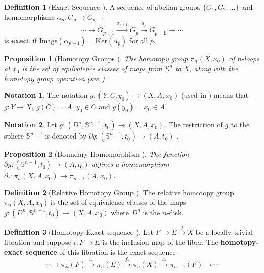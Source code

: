 \documentclass[12pt]{article}
\newtheorem{prop}{Proposition}
\theoremstyle{definition}
\newtheorem{defn}{Definition}
\newtheorem*{notation}{Notation}
\begin{document}
\begin{defn}[Exact Sequence \cite{intro-top-manifolds}]
    A sequence of abelian groups \(\{G_1, G_2, \ldots\}\) and
    homomorphisms \(\alpha_p : G_p \rightarrow G_{p-1}\)
    \[
        \cdots \rightarrow G_{p+1} \xrightarrow{\alpha_{p+1}} G_p
    \xrightarrow{\alpha_p} G_{p-1} \rightarrow \cdots
    \]
    is \textbf{exact} if \(\text{Image}(\alpha_{p+1}) = \text{Ker}(\alpha_p)\)
    for all \(p\).
\end{defn}

\begin{prop}[Homotopy Groups \cite{topology-fiber-bundles}]
    The homotopy group \(\pi_n(X,x_0)\) of \(n\)-loops at \(x_0\) is the
    set of equivalence classes of maps from \(\mathbb{S}^n\) to \(X\), along
    with the homotopy group operation (see \cite{intro-top-manifolds}).
\end{prop}

\begin{notation}
    The notation \(g : (Y,C,y_0) \rightarrow (X,A,x_0)\) (used in 
    \cite{topology-fiber-bundles}) means that \(g : Y \rightarrow X\), 
    \(g(C) = A\), \(y_0 \in C\) and \(g(y_0) = x_0 \in A\).
\end{notation}

\begin{notation}
    Let \(g : (D^n, \mathbb{S}^{n-1},t_0) \rightarrow (X,A,x_0)\). 
    The restriction of \(g\) to the sphere \(\mathbb{S}^{n-1}\) is denoted by 
    \(\partial g : (\mathbb{S}^{n-1},t_0) \rightarrow (A,t_0)\)
    \cite{topology-fiber-bundles}.
\end{notation}

\begin{prop}[Boundary Homomorphism \cite{topology-fiber-bundles}]
    The function \(\partial g : (\mathbb{S}^{n-1},t_0) \rightarrow (A,t_0)\)
    defines a homomorphism 
    \(\partial_* : \pi_n(X,A,x_0) \rightarrow \pi_{n-1}(A,x_0)\).
\end{prop}

\begin{defn}[Relative Homotopy Group \cite{topology-fiber-bundles}]
    The relative homotopy group \(\pi_n(X,A,x_0)\) is the set of equivalence classes
    of the maps \(g : (D^n,\mathbb{S}^{n-1},t_0) \rightarrow (X, A, x_0)\)
    where \(D^n\) is the \(n\)-disk.
\end{defn}

\begin{defn}[Homotopy-Exact sequence \cite{topology-fiber-bundles}]
    Let \(F \rightarrow E \xrightarrow{f} X\) be a locally trivial fibration and suppose
    \(\iota : F \rightarrow E\) is the inclusion map of the fiber.
    The \textbf{homotopy-exact sequence} of this fibration is the exact sequence
    \[
        \cdots \rightarrow \pi_n(F) \xrightarrow{\iota_*} \pi_n(E) 
        \xrightarrow{f_*} \pi_n(X) \xrightarrow{\partial_*} \pi_{n-1}(F)
        \rightarrow \cdots
    \]
\end{defn}
\end{document}
